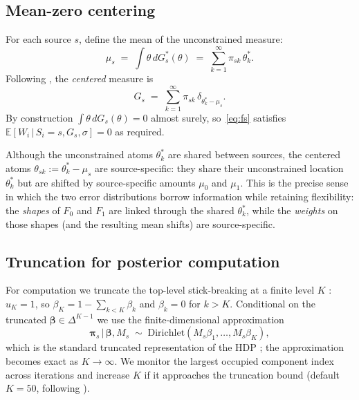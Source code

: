\documentclass[11pt]{article}
\theoremstyle{plain}
\theoremstyle{definition}
\theoremstyle{remark}
\newcommand{\E}{\mathbb{E}}
\newcommand{\1}{\mathds{1}}
\newcommand{\given}{\,|\,}
\begin{document}
\subsection{Mean-zero centering}\label{sec:centering}

For each source $s$, define the mean of the unconstrained measure:
\begin{equation}
\mu_s \;=\; \int \theta\, dG_s^*(\theta) \;=\; \sum_{k=1}^\infty \pi_{sk}\, \theta_k^*.
\end{equation}
Following \citet{yang2010semiparametric}, the \emph{centered} measure is
\begin{equation}
G_s \;=\; \sum_{k=1}^\infty \pi_{sk}\, \delta_{\theta_k^* - \mu_s}.
\end{equation}
By construction $\int \theta\, dG_s(\theta) = 0$ almost surely, so~\eqref{eq:fs} satisfies $\E[W_i \given S_i = s, G_s, \sigma] = 0$ as required.

Although the unconstrained atoms $\theta_k^*$ are shared between sources, the centered atoms $\theta_{sk} := \theta_k^* - \mu_s$ are source-specific: they share their unconstrained location $\theta_k^*$ but are shifted by source-specific amounts $\mu_0$ and $\mu_1$. This is the precise sense in which the two error distributions borrow information while retaining flexibility: the \emph{shapes} of $F_0$ and $F_1$ are linked through the shared $\theta_k^*$, while the \emph{weights} on those shapes (and the resulting mean shifts) are source-specific.

\subsection{Truncation for posterior computation}

For computation we truncate the top-level stick-breaking at a finite level $K$ \citep{ishwaran2001gibbs}: $u_K = 1$, so $\beta_K = 1 - \sum_{k < K} \beta_k$ and $\beta_k = 0$ for $k > K$. Conditional on the truncated $\bm{\beta} \in \Delta^{K-1}$ we use the finite-dimensional approximation
\begin{equation}
\bm{\pi}_s \given \bm{\beta}, M_s \;\sim\; \mathrm{Dirichlet}(M_s \beta_1, \ldots, M_s \beta_K),
\label{eq:pi-prior}
\end{equation}
which is the standard truncated representation of the HDP \citep{teh2006hierarchical, wang2009variational}; the approximation becomes exact as $K \to \infty$. We monitor the largest occupied component index across iterations and increase $K$ if it approaches the truncation bound (default $K = 50$, following \citet{henderson2020individualized}).
\end{document}
